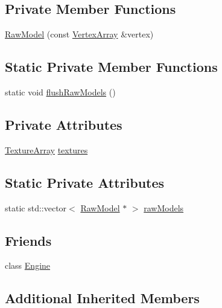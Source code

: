 \subsection*{Private Member Functions}
\begin{DoxyCompactItemize}
\item 
\hyperlink{classpcs_1_1RawModel_addb04fed9a364e9c24b8b4f4b69480a7}{Raw\+Model} (const \hyperlink{classpcs_1_1VertexArray}{Vertex\+Array} \&vertex)
\end{DoxyCompactItemize}
\subsection*{Static Private Member Functions}
\begin{DoxyCompactItemize}
\item 
static void \hyperlink{classpcs_1_1RawModel_adbbbfe236105284084c5fd9e16afda7b}{flush\+Raw\+Models} ()
\end{DoxyCompactItemize}
\subsection*{Private Attributes}
\begin{DoxyCompactItemize}
\item 
\hyperlink{unionpcs_1_1TextureArray}{Texture\+Array} \hyperlink{classpcs_1_1RawModel_a5441811d19297669eefdb405ea94ce0c}{textures}
\end{DoxyCompactItemize}
\subsection*{Static Private Attributes}
\begin{DoxyCompactItemize}
\item 
static std\+::vector$<$ \hyperlink{classpcs_1_1RawModel}{Raw\+Model} $\ast$ $>$ \hyperlink{classpcs_1_1RawModel_a49828e249759c0f359ebce06ad651332}{raw\+Models}
\end{DoxyCompactItemize}
\subsection*{Friends}
\begin{DoxyCompactItemize}
\item 
class \hyperlink{classpcs_1_1RawModel_a3e1914489e4bed4f9f23cdeab34a43dc}{Engine}
\end{DoxyCompactItemize}
\subsection*{Additional Inherited Members}


